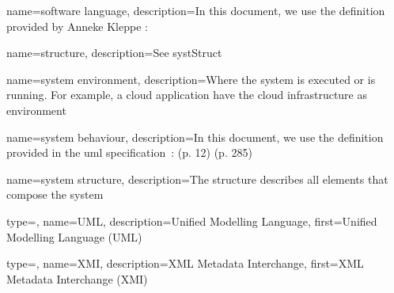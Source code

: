 {
	name={software language},
	description={In this document, we use the definition provided by Anneke Kleppe \cite{kleppe2008software}: }
}

{
	name={structure},
	description={See \gls{systStruct}}
}

{
	name={system environment},
	description={Where the system is executed or is running. For example, a cloud application have the cloud infrastructure as environment}
}

{
	name={system behaviour},
	description={In this document, we use the definition provided in the \gls{uml} specification~\cite{omg2017umlspec}: (p. 12) (p. 285)}
}

{
	name={system structure},
	description={The structure describes all elements that compose the system}
}

{
	type=\acronymtype,
	name={UML},
	description={Unified Modelling Language},
	first={Unified Modelling Language (UML)}
}

{
	type=\acronymtype,
	name={XMI},
	description={XML Metadata Interchange},
	first={XML Metadata Interchange (XMI)}
}

